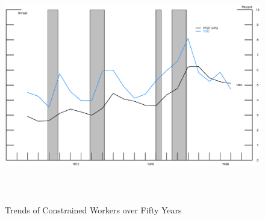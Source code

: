 \newpage

\begin{figure}[h]
\begin{center}
\caption{Trends of Constrained Workers over Fifty Years \label{inf}}
\includegraphics[width=5in, height=4in]{figure1.eps}
\end{center}
\end{figure}

\newpage

